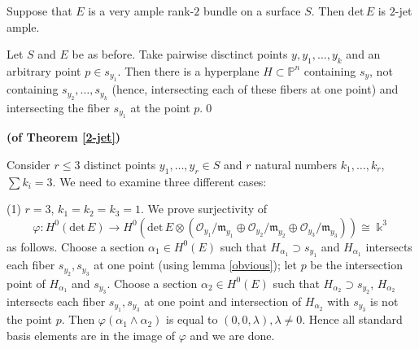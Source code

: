 \documentclass[10pt,a4paper]{amsart}
\renewenvironment{proof}[1]{\par\medskip\noindent\textbf{#1}\enspace\ignorespaces}{\par\medskip}
\begin{document}
\begin{theorem}
    \label{2-jet}
    Suppose that $E$ is a very ample rank-$2$ bundle on a surface $S$.
    Then $\mathrm{det}\, E$ is $2$-jet ample.
\end{theorem}

\begin{lemma}
    \label{obvious}
    Let $S$ and $E$ be as before. Take pairwise disctinct points $y, y_1,\dots, y_k$ and an arbitrary point $p \in s_{y_1}$.
    Then there is a hyperplane $H \subset \mathbb P^n$ containing $s_y$, not containing $s_{y_2}, \dots, s_{y_k}$ (hence, intersecting each of these fibers at one point) and intersecting the fiber $s_{y_1}$ at the point $p$.\qed
\end{lemma}

\begin{proof}{(of Theorem \ref{2-jet})}

    Consider $r\le3$ distinct points $y_1,\dots,y_r\in S$ and $r$ natural numbers $k_1,\dots,k_r$, $\sum k_i=3$.
    We need to examine three different cases:

    (1) $r=3$, $k_1=k_2=k_3=1$. We prove surjectivity of
    \[
    \varphi \colon H^0(\mathrm{det}\, E) \to H^0(\mathrm{det} \,E\otimes (\mathcal O_{y_1}/ \mathfrak m_{y_1}\oplus \mathcal O_{y_2}/ \mathfrak m_{y_2} \oplus \mathcal O_{y_3}/ \mathfrak m_{y_3})) \cong \Bbbk^3
    \]
    as follows. Choose a section $\alpha_1 \in H^0(E)$ such that $H_{\alpha_1} \supset s_{y_1}$ and $H_{\alpha_1}$ intersects each fiber $s_{y_2}, s_{y_3}$ at one point (using lemma \ref{obvious}); let $p$ be the intersection point of $H_{\alpha_1}$ and $s_{y_3}$.
    Choose a section $\alpha_2 \in H^0(E)$ such that $H_{\alpha_2} \supset s_{y_2}$, $H_{\alpha_2}$ intersects each fiber $s_{y_1}, s_{y_3}$ at one point and intersection of $H_{\alpha_2}$ with $s_{y_3}$ is not the point $p$.
    Then $\varphi (\alpha_1 \wedge \alpha_2)$ is equal to $(0, 0, \lambda), \lambda \neq 0$. Hence all standard basis elements are in the image of $\varphi$ and we are done.


\end{proof}
\end{document}
